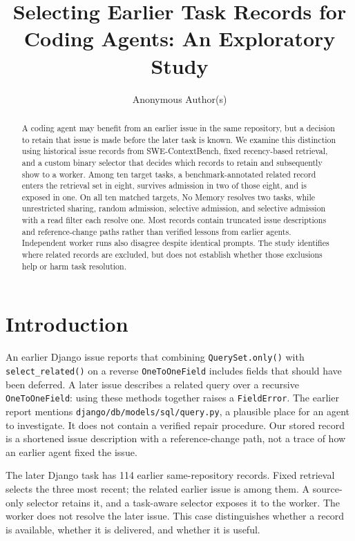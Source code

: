\documentclass[sigconf,anonymous]{aamas}
\title{Selecting Earlier Task Records for Coding Agents: An Exploratory Study}
\author{Anonymous Author(s)}
\affiliation{\institution{Anonymous}}
\begin{document}
\begin{abstract}
A coding agent may benefit from an earlier issue in the same repository, but a decision to retain that issue is made before the later task is known. We examine this distinction using historical issue records from SWE-ContextBench, fixed recency-based retrieval, and a custom binary selector that decides which records to retain and subsequently show to a worker. Among ten target tasks, a benchmark-annotated related record enters the retrieval set in eight, survives admission in two of those eight, and is exposed in one. On all ten matched targets, No Memory resolves two tasks, while unrestricted sharing, random admission, selective admission, and selective admission with a read filter each resolve one. Most records contain truncated issue descriptions and reference-change paths rather than verified lessons from earlier agents. Independent worker runs also disagree despite identical prompts. The study identifies where related records are excluded, but does not establish whether those exclusions help or harm task resolution.
\end{abstract}
\maketitle

\section{Introduction}
An earlier Django issue reports that combining \texttt{QuerySet.only()} with \texttt{select\_related()} on a reverse \texttt{OneToOneField} includes fields that should have been deferred. A later issue describes a related query over a recursive \texttt{OneToOneField}: using these methods together raises a \texttt{FieldError}. The earlier report mentions \texttt{django/db/models/sql/query.py}, a plausible place for an agent to investigate. It does not contain a verified repair procedure. Our stored record is a shortened issue description with a reference-change path, not a trace of how an earlier agent fixed the issue.

The later Django task has 114 earlier same-repository records. Fixed retrieval selects the three most recent; the related earlier issue is among them. A source-only selector retains it, and a task-aware selector exposes it to the worker. The worker does not resolve the later issue. This case distinguishes whether a record is available, whether it is delivered, and whether it is useful.
\end{document}
